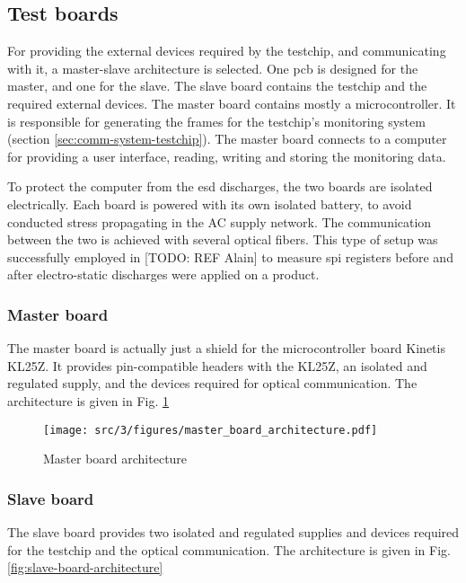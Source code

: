 \subsection{Test boards}

For providing the external devices required by the testchip, and communicating with it, a master-slave architecture is selected.
One \gls{pcb} is designed for the master, and one for the slave.
The slave board contains the testchip and the required external devices.
The master board contains mostly a microcontroller.
It is responsible for generating the frames for the testchip's monitoring system (section \ref{sec:comm-system-testchip}).
The master board connects to a computer for providing a user interface, reading, writing and storing the monitoring data.

To protect the computer from the \gls{esd} discharges, the two boards are isolated electrically.
Each board is powered with its own isolated battery, to avoid conducted stress propagating in the AC supply network.
The communication between the two is achieved with several optical fibers.
This type of setup was successfully employed in [TODO: REF Alain] to measure \gls{spi} registers before and after electro-static discharges were applied on a product.


\subsubsection{Master board}

The master board is actually just a shield for the microcontroller board Kinetis KL25Z.
It provides pin-compatible headers with the KL25Z, an isolated and regulated supply, and the devices required for optical communication.
The architecture is given in Fig. \ref{fig:master-board-architecture}

\begin{figure}[!htbp]
  \centering
  \texttt{[image: src/3/figures/master\_board\_architecture.pdf]}
  \caption{Master board architecture}
  \label{fig:master-board-architecture}
\end{figure}


\subsubsection{Slave board}
The slave board provides two isolated and regulated supplies and devices required for the testchip and the optical communication.
The architecture is given in Fig. \ref{fig:slave-board-architecture}

